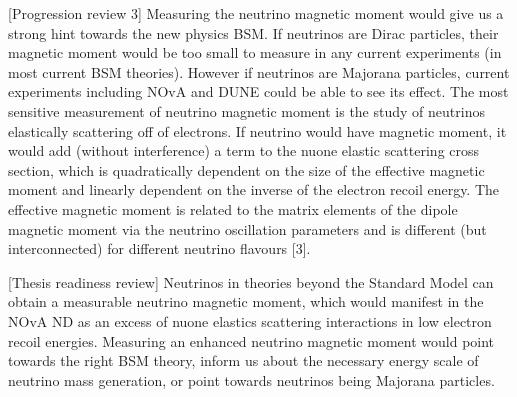 
[Progression review 3] Measuring the neutrino magnetic moment would give us a strong hint towards the new physics \gls{BSM}. If neutrinos are Dirac particles, their magnetic moment would be too small to measure in any current experiments (in most current \gls{BSM} theories). However if neutrinos are Majorana particles, current experiments including \gls{NOvA} and \gls{DUNE} could be able to see its effect. The most sensitive measurement of neutrino magnetic moment is the study of neutrinos elastically scattering off of electrons. If neutrino would have magnetic moment, it would add (without interference) a term to the \gls{nuone} elastic scattering cross section, which is quadratically dependent on the size of the effective magnetic moment and linearly dependent on the inverse of the electron recoil energy. The effective magnetic moment is related to the matrix elements of the dipole magnetic moment via the neutrino oscillation parameters and is different (but interconnected) for different neutrino flavours [3].

[Thesis readiness review] Neutrinos in theories beyond the Standard Model can obtain a measurable neutrino magnetic moment, which would manifest in the \gls{NOvA} \gls{ND} as an excess of \gls{nuone} elastics scattering interactions in low electron recoil energies. Measuring an enhanced neutrino magnetic moment would point towards the right \gls{BSM} theory, inform us about the necessary energy scale of neutrino mass generation, or point towards neutrinos being Majorana particles. 



